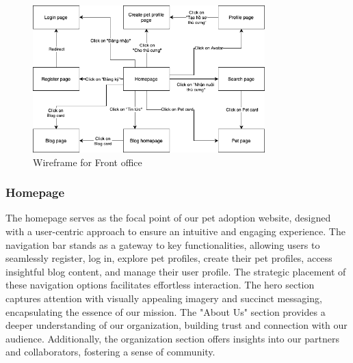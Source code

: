 \begin{figure}[H]
    \centering
    \includegraphics[width=0.8\textwidth]{Figures/wireframe_fo.png}
    \caption{Wireframe for Front office}
\end{figure}

\subsubsection{Homepage}

The homepage serves as the focal point of our pet adoption website, designed with a user-centric approach to ensure an intuitive and engaging experience. The navigation bar stands as a gateway to key functionalities, allowing users to seamlessly register, log in, explore pet profiles, create their pet profiles, access insightful blog content, and manage their user profile. The strategic placement of these navigation options facilitates effortless interaction. The hero section captures attention with visually appealing imagery and succinct messaging, encapsulating the essence of our mission. The "About Us" section provides a deeper understanding of our organization, building trust and connection with our audience. Additionally, the organization section offers insights into our partners and collaborators, fostering a sense of community.

